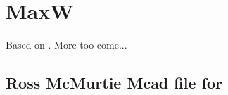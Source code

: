 \chapter{MaxW}

Based on \citep{McMurtrie2013}. More too come...


\section{Ross McMurtie Mcad file for \citep{McMurtrie2013}} 

  

